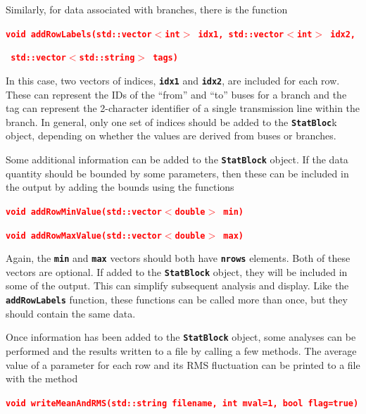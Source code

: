 \documentclass[12pt]{report} %
\begin{document}
Similarly, for data associated with branches, there is the function

\textcolor{red}{\texttt{\textbf{void addRowLabels(std::vector$\boldsymbol{\mathrm{<}}$int$\boldsymbol{\mathrm{>}}$ idx1, std::vector$\boldsymbol{\mathrm{<}}$int$\boldsymbol{\mathrm{>}}$ idx2,}}}

\textcolor{red}{\texttt{\textbf{                  std::vector$\boldsymbol{\mathrm{<}}$std::string$\boldsymbol{\mathrm{>}}$ tags)}}}

In this case, two vectors of indices, \texttt{\textbf{idx1}} and \texttt{\textbf{idx2}}, are included for each row. These can represent the IDs of the ``from'' and ``to'' buses for a branch and the tag can represent the 2-character identifier of a single transmission line within the branch. In general, only one set of indices should be added to the \texttt{\textbf{StatBloc}}k object, depending on whether the values are derived from buses or branches.

Some additional information can be added to the \texttt{\textbf{StatBlock}} object. If the data quantity should be bounded by some parameters, then these can be included in the output by adding the bounds using the functions

\textcolor{red}{\texttt{\textbf{void addRowMinValue(std::vector$\boldsymbol{\mathrm{<}}$double$\boldsymbol{\mathrm{>}}$ min)}}}

\textcolor{red}{\texttt{\textbf{void addRowMaxValue(std::vector$\boldsymbol{\mathrm{<}}$double$\boldsymbol{\mathrm{>}}$ max)}}}

Again, the \texttt{\textbf{min}} and \texttt{\textbf{max}} vectors should both have \texttt{\textbf{nrows}} elements. Both of these vectors are optional. If added to the \texttt{\textbf{StatBlock}} object, they will be included in some of the output. This can simplify subsequent analysis and display. Like the \texttt{\textbf{addRowLabels}} function, these functions can be called more than once, but they should contain the same data.

Once information has been added to the \texttt{\textbf{StatBlock}} object, some analyses can be performed and the results written to a file by calling a few methods. The average value of a parameter for each row and its RMS fluctuation can be printed to a file with the method

\textcolor{red}{\texttt{\textbf{void writeMeanAndRMS(std::string filename, int mval=1, bool flag=true)}}}
\end{document}
